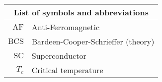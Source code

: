 	\thispagestyle{plain}
	\begin{table}
		\centering
		\begin{tabular}{r l}
			\multicolumn{2}{c}{\textbf{List of symbols and abbreviations}} \\
			\midrule
			$\mathrm{AF}$ & Anti-Ferromagnetic \\
			$\mathrm{BCS}$ & Bardeen-Cooper-Schrieffer (theory) \\
			$\mathrm{SC}$ & Superconductor \\
			$T_c$ & Critical temperature \\
		\end{tabular}
	\end{table}
\restoregeometry 
